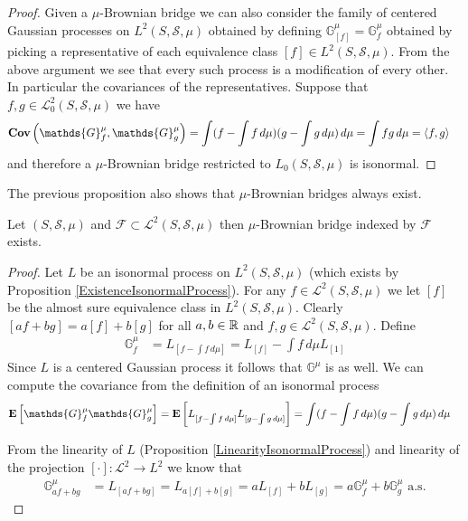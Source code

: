 \begin{proof}
Given a $\mu$-Brownian bridge we can also consider the family of centered Gaussian processes on $L^2(S, \mathcal{S}, \mu)$ obtained by defining $\mathds{G}^\mu_{[f]} = \mathds{G}^\mu_{f}$ obtained by picking a representative of each equivalence class $[f] \in L^2(S, \mathcal{S}, \mu)$.  From the above argument we see that every such process is a modification of every other.  In particular the covariances of the representatives.  Suppose that $f,g \in \mathcal{L}_0^2(S, \mathcal{S}, \mu)$ we have
\begin{align*}
\scovariance{\mathds{G}^\mu_f}{\mathds{G}^\mu_g} &= \int (f - \int f \, d\mu)(g - \int g \, d\mu) \, d\mu = \int f g \, d\mu = \langle f,g \rangle
\end{align*}
and therefore a $\mu$-Brownian bridge restricted to $L_0(S, \mathcal{S}, \mu)$ is isonormal.
\end{proof}

The previous proposition also shows that $\mu$-Brownian bridges always exist.  
\begin{prop}\label{ExistenceGeneralizedBrownianBridge}Let $(S, \mathcal{S}, \mu)$ and $\mathcal{F} \subset \mathcal{L}^2(S, \mathcal{S}, \mu)$ then $\mu$-Brownian bridge indexed by $\mathcal{F}$ exists.
\end{prop}
\begin{proof}
Let $L$ be an isonormal process on $L^2(S, \mathcal{S}, \mu)$ (which exists by Proposition \ref{ExistenceIsonormalProcess}).  For any $f \in  \mathcal{L}^2(S, \mathcal{S}, \mu)$ we let $[f]$ be the almost sure equivalence class in $L^2(S, \mathcal{S}, \mu)$.  Clearly $[a f + b g] = a [f] + b[g]$ for all $a,b \in \mathbb{R}$ and $f, g \in \mathcal{L}^2(S, \mathcal{S}, \mu)$.  Define 
\begin{align*}
\mathds{G}^\mu_f &= L_{[f - \int f \, d\mu]} = L_{[f]} - \int f \, d\mu L_{[1]}
\end{align*}
Since $L$ is a centered Gaussian process it follows that $\mathds{G}^\mu$ is as well.  We can compute the covariance from the definition of an isonormal process
\begin{align*}
\expectation{\mathds{G}^\mu_f \mathds{G}^\mu_g} &= \expectation{L_{[f-\int f \, d\mu]}  L_{[g - \int g\, d\mu]}} = \int (f-\int f \, d\mu) (g - \int g\, d\mu) \, d\mu
\end{align*}

From the linearity of $L$ (Proposition \ref{LinearityIsonormalProcess}) and linearity of the projection $[\cdot] : \mathcal{L}^2 \to L^2$ we know that
\begin{align*}
\mathds{G}^\mu_{af + bg} &= L_{[af + bg]} = L_{a[f] + b[g]} = a L_{[f]} + b L_{[g]} = a \mathds{G}^\mu_f + b \mathds{G}^\mu_g \text{ a.s.}
\end{align*}
\end{proof}

